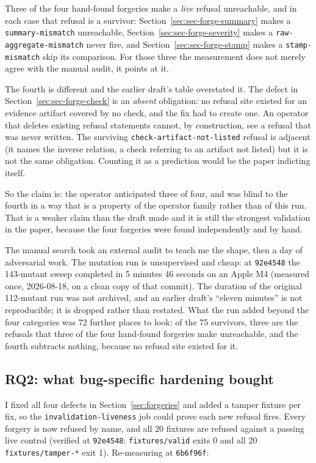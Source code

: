 \documentclass[11pt]{article}
\begin{document}
Three of the four hand-found forgeries make a \emph{live} refusal unreachable, and in each
case that refusal is a survivor: Section~\ref{sec:sec-forge-summary} makes a
\texttt{summary-mismatch} unreachable, Section~\ref{sec:sec-forge-severity} makes a
\texttt{raw-aggregate-mismatch} never fire, and Section~\ref{sec:sec-forge-stamp} makes a
\texttt{stamp-mismatch} skip its comparison. For those three the measurement does not merely
agree with the manual audit, it points at it.

The fourth is different and the earlier draft's table overstated it. The defect in
Section~\ref{sec:sec-forge-check} is an \emph{absent} obligation: no refusal site existed for
an evidence artifact covered by no check, and the fix had to create one. An operator that
deletes existing refusal statements cannot, by construction, see a refusal that was never
written. The surviving \texttt{check-artifact-not-listed} refusal is adjacent (it names the
inverse relation, a check referring to an artifact not listed) but it is not the same
obligation. Counting it as a prediction would be the paper indicting itself.

So the claim is: the operator anticipated three of four, and was blind to the fourth in a way
that is a property of the operator family rather than of this run. That is a weaker claim
than the draft made and it is still the strongest validation in the paper, because the four
forgeries were found independently and by hand.

The manual search took an external audit to teach me the shape, then a day of adversarial
work. The mutation run is unsupervised and cheap: at \texttt{92e4548} the 143-mutant sweep
completed in 5 minutes 46 seconds on an Apple M4 (measured once, 2026-08-18, on a clean copy of
that commit). The duration of the original 112-mutant run was not archived, and an
earlier draft's ``eleven minutes'' is not reproducible; it is dropped rather than restated.
What the run added beyond the four categories was 72 further places to look: of the 75
survivors, three are the refusals that three of the four hand-found forgeries make
unreachable, and the fourth subtracts nothing, because no refusal site existed for it.

\subsection{RQ2: what bug-specific hardening bought}
\label{sec:rq2}

I fixed all four defects in Section~\ref{sec:forgeries} and added a tamper fixture per fix,
so the \texttt{invalidation-liveness} job could prove each new refusal fires. Every forgery is
now refused by name, and all 20 fixtures are refused against a passing live control (verified
at \texttt{92e4548}: \texttt{fixtures/valid} exits 0 and all 20 \texttt{fixtures/tamper-*}
exit 1). Re-measuring at \texttt{6b6f96f}:
\end{document}
